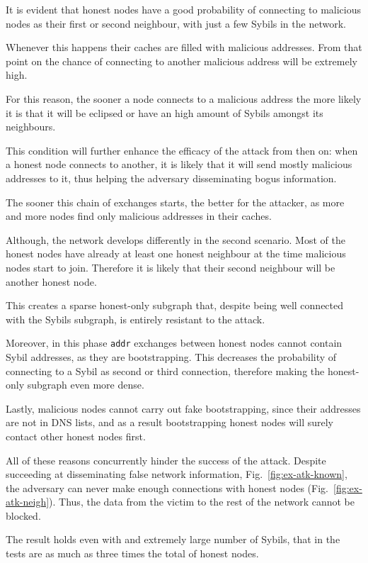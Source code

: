 It is evident that honest nodes have a good probability of connecting to malicious nodes as their first or second neighbour, with just a few Sybils in the network.

Whenever this happens their caches are filled with malicious addresses. From that point on the chance of connecting to another malicious address will be extremely high.

For this reason, the sooner a node connects to a malicious address the more likely it is that it will be eclipsed or have an high amount of Sybils amongst its neighbours.

This condition will further enhance the efficacy of the attack from then on: when a honest node connects to another, it is likely that it will send mostly malicious addresses to it, thus helping the adversary disseminating bogus information.

The sooner this chain of exchanges starts, the better for the attacker, as more and more nodes find only malicious addresses in their caches.

Although, the network develops differently in the second scenario. Most of the honest nodes have already at least one honest neighbour at the time malicious nodes start to join. Therefore it is likely that their second neighbour will be another honest node.

This creates a sparse honest-only subgraph that, despite being well connected with the Sybils subgraph, is entirely resistant to the attack.

Moreover, in this phase \texttt{addr} exchanges between honest nodes cannot contain Sybil addresses, as they are bootstrapping. This decreases the probability of connecting to a Sybil as second or third connection, therefore making the honest-only subgraph even more dense.

Lastly, malicious nodes cannot carry out fake bootstrapping, since their addresses are not in DNS lists, and as a result bootstrapping honest nodes will surely contact other honest nodes first.

All of these reasons concurrently hinder the success of the attack. Despite succeeding at disseminating false network information, Fig.~\ref{fig:ex-atk-known}, the adversary can never make enough connections with honest nodes (Fig.~\ref{fig:ex-atk-neigh}).
Thus, the data from the victim to the rest of the network cannot be blocked.

The result holds even with and extremely large number of Sybils, that in the tests are as much as three times the total of honest nodes.


